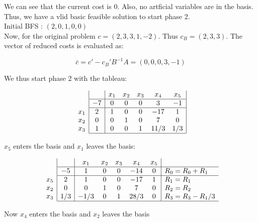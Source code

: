 We can see that the current cost is 0. Also, no artficial variables are in the basis. Thus, we have a vlid basic feasible solution to start phase 2. \\

Initial BFS : $(2,0,1,0,0)$ \\

Now, for the original problem $c = (2,3,3,1,-2)$. Thus $c_B = (2,3,3)$. The vector of reduced costs is evaluated as:

\[ \bar{c} = c' - c_B'B^{-1}A = (0,0,0,3,-1)\]

We thus start phase 2 with the tableau:


$$
\begin{array}{c}
\\
\\
x_1\\
x_2 \\
x_3 \\ 
\end{array}
\begin{array}{|c|ccccc|}
     & x_1 & x_2 & x_3 & x_4 & x_5  \\ \hline
   -7 & 0 & 0 & 0 & 3 & -1 \\ \hline
   2 & 1 & 0 & 0  & -17  & 1 \\
   0 & 0 & 1 & 0 & 7 & 0  \\
   1 & 0 & 0 & 1 & 11/3 & 1/3 \\ \hline
\end{array}
$$

$x_5$ enters the basis and $x_1$ leaves the basis:

$$
\begin{array}{c}
\\
\\
x_5\\
x_2 \\
x_3 \\ 
\end{array}
\begin{array}{|c|ccccc|l}
     & x_1 & x_2 & x_3 & x_4 & x_5  \\ \hline
   -5 & 1 & 0 & 0 & -14 & 0 & R_0 = R_0 + R_1\\ \hline
   2 & 1 & 0 & 0  & -17  & 1 & R_1 = R_1\\
   0 & 0 & 1 & 0 & 7 & 0  & R_2 = R_2\\
   1/3 & -1/3 & 0 & 1 & 28/3 & 0 & R_3 = R_3 - R_1/3 \\ \hline
\end{array}
$$

Now $x_4$ enters the basis and $x_2$ leaves the basis

